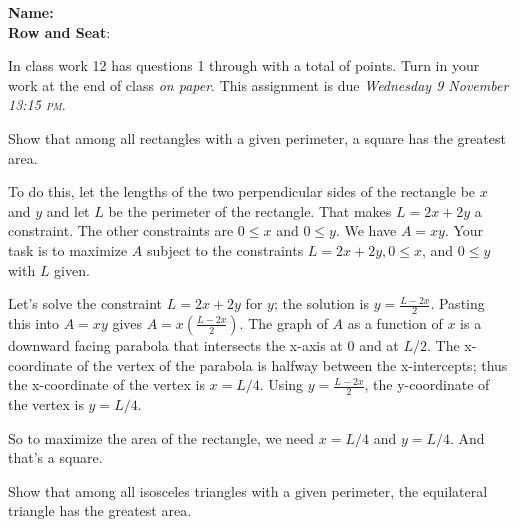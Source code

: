 \documentclass[12pt,fleqn,answers]{exam}
\newcommand\PM{\textsc{pm}}
\newcommand{\quiz}{12}
\newcommand{\term}{Fall}
\newcommand{\due}{Wednesday 9 November 13:15 \PM}
\newcommand{\class}{MATH 115}
\begin{document}
\large
\vspace{0.1in}
\noindent\makebox[3.0truein][l]{\textbf{\class}}
\textbf{Name:} \hrulefill \\
\noindent \makebox[3.0truein][l]{\textbf{In class work \quiz, \term \/ \the\year}}
\textbf{Row and Seat}:\hrulefill\\
\vspace{0.1in}


\noindent  In class work  \quiz\/  has questions 1 through  \numquestions \/ with a total of  \numpoints\/  points.   
Turn in your work at the end of class  \emph{on paper}. This assignment is due \emph{\due}.

\vspace{0.1in}


\begin{questions} 

    \question [5] Show that among all rectangles with a given perimeter,
    a square has the greatest area. 
    
    \quad To do this, let the lengths of the two perpendicular sides of the 
     rectangle be $x$ and $y$ and let $L$ be the perimeter of the
     rectangle. That makes $L = 2 x + 2 y$ a constraint. The other 
     constraints are $0 \leq x$ and $0 \leq y$.  We have $A = xy$.  Your task is to 
     maximize $A$ subject to the constraints $L = 2 x + 2 y, 0 \leq x$,
     and $0 \leq y$ with $L$  given.
     
     \begin{solution} Let's solve the constraint $L = 2 x + 2 y$  for $y$; the solution is $y =\frac{L - 2 x}{2}$. Pasting this into $A = xy$ gives 
     $A = x (\frac{L - 2 x}{2})$.  The graph of $A$ as a function of $x$ is a downward facing parabola that intersects the x-axis at $0$ and at $L/2$.
     The x-coordinate of the vertex of the parabola is halfway between the x-intercepts; thus the x-coordinate of the vertex is $x = L/4$.  Using
     $y =\frac{L - 2 x}{2}$, the y-coordinate of the vertex is $y = L/4$. 
     
     So to maximize the area of the rectangle, we need $x = L/4$ and $y = L/4$. And that's a square.
     
     \end{solution}

    \newpage

    \question [5] Show that among all isosceles triangles with a given
    perimeter, the equilateral triangle has the greatest area.


\end{questions}
\end{document}
